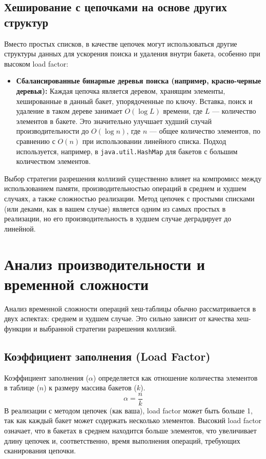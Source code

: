 \documentclass[a4paper,12pt]{article}
\begin{document}
\subsection{Хеширование с цепочками на основе других структур}

Вместо простых списков, в качестве цепочек могут использоваться другие структуры данных для ускорения поиска и удаления внутри бакета, особенно при высоком load factor:
\begin{itemize}
    \item \textbf{Сбалансированные бинарные деревья поиска (например, красно-черные деревья):} Каждая цепочка является деревом, хранящим элементы, хешированные в данный бакет, упорядоченные по ключу. Вставка, поиск и удаление в таком дереве занимает \(O(\log L)\) времени, где $L$ --- количество элементов в бакете. Это значительно улучшает худший случай производительности до \(O(\log n)\), где $n$ --- общее количество элементов, по сравнению с \(O(n)\) при использовании линейного списка. Подход используется, например, в \texttt{java.util.HashMap} для бакетов с большим количеством элементов.
\end{itemize}
Выбор стратегии разрешения коллизий существенно влияет на компромисс между использованием памяти, производительностью операций в среднем и худшем случаях, а также сложностью реализации. Метод цепочек с простыми списками (или деками, как в вашем случае) является одним из самых простых в реализации, но его производительность в худшем случае деградирует до линейной.

\section{Анализ производительности и временной сложности}

Анализ временной сложности операций хеш-таблицы обычно рассматривается в двух аспектах: среднем и худшем случае. Это сильно зависит от качества хеш-функции и выбранной стратегии разрешения коллизий.

\subsection{Коэффициент заполнения (Load Factor)}

Коэффициент заполнения (\( \alpha \)) определяется как отношение количества элементов в таблице (\( n \)) к размеру массива бакетов (\( k \)).
\[ \alpha = \frac{n}{k} \]
В реализации с методом цепочек (как ваша), load factor может быть больше 1, так как каждый бакет может содержать несколько элементов. Высокий load factor означает, что в бакетах в среднем находится больше элементов, что увеличивает длину цепочек и, соответственно, время выполнения операций, требующих сканирования цепочки.
\end{document}
